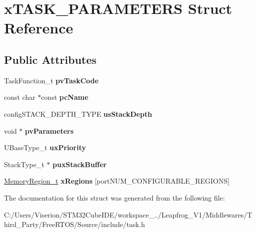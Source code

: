 \hypertarget{structx_t_a_s_k___p_a_r_a_m_e_t_e_r_s}{}\section{x\+T\+A\+S\+K\+\_\+\+P\+A\+R\+A\+M\+E\+T\+E\+RS Struct Reference}
\label{structx_t_a_s_k___p_a_r_a_m_e_t_e_r_s}
\subsection*{Public Attributes}
\begin{DoxyCompactItemize}
\item 
\mbox{\label{structx_t_a_s_k___p_a_r_a_m_e_t_e_r_s_a7527993402054565cda38251c8922880}} 
Task\+Function\+\_\+t {\bfseries pv\+Task\+Code}
\item 
\mbox{\label{structx_t_a_s_k___p_a_r_a_m_e_t_e_r_s_a7b3e5583acf9de8bacac572a42246459}} 
const char $\ast$const {\bfseries pc\+Name}
\item 
\mbox{\label{structx_t_a_s_k___p_a_r_a_m_e_t_e_r_s_ac2edb442cd1a9dc5435c7735ed99c83e}} 
config\+S\+T\+A\+C\+K\+\_\+\+D\+E\+P\+T\+H\+\_\+\+T\+Y\+PE {\bfseries us\+Stack\+Depth}
\item 
\mbox{\label{structx_t_a_s_k___p_a_r_a_m_e_t_e_r_s_accbb9f4de75b5b5be750198b52390c7f}} 
void $\ast$ {\bfseries pv\+Parameters}
\item 
\mbox{\label{structx_t_a_s_k___p_a_r_a_m_e_t_e_r_s_aa1aff14035db645e2bdcc85b3cdc9bab}} 
U\+Base\+Type\+\_\+t {\bfseries ux\+Priority}
\item 
\mbox{\label{structx_t_a_s_k___p_a_r_a_m_e_t_e_r_s_a946c525d3765369780538f9bc3f3586d}} 
Stack\+Type\+\_\+t $\ast$ {\bfseries pux\+Stack\+Buffer}
\item 
\mbox{\label{structx_t_a_s_k___p_a_r_a_m_e_t_e_r_s_ae8b97c6b7a344bf09b066b0844844d66}} 
\mbox{\hyperlink{structx_m_e_m_o_r_y___r_e_g_i_o_n}{Memory\+Region\+\_\+t}} {\bfseries x\+Regions} \mbox{[}port\+N\+U\+M\+\_\+\+C\+O\+N\+F\+I\+G\+U\+R\+A\+B\+L\+E\+\_\+\+R\+E\+G\+I\+O\+NS\mbox{]}
\end{DoxyCompactItemize}


The documentation for this struct was generated from the following file\+:\begin{DoxyCompactItemize}
\item 
C\+:/\+Users/\+Viserion/\+S\+T\+M32\+Cube\+I\+D\+E/workspace\+\_../\+Leapfrog\+\_\+\+V1/\+Middlewares/\+Third\+\_\+\+Party/\+Free\+R\+T\+O\+S/\+Source/include/task.\+h\end{DoxyCompactItemize}

